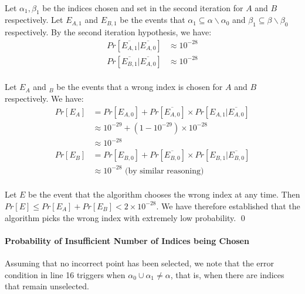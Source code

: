 \paragraph{}
Let $\alpha_1, \beta_1$ be the indices chosen and set in the second iteration for $A$ and $B$ respectively. Let $E_{A,1}$ and $E_{B,1}$ be the events that $\alpha_1 \subseteq \alpha \backslash \alpha_0$ and $\beta_1 \subseteq \beta \backslash \beta_0$ respectively. By the second iteration hypothesis, we have:
\begin{align*}
    Pr[\overline{E_{A,1}} | \overline{E_{A,0}}] &\approx 10^{-28}\\
    Pr[\overline{E_{B,1}} | \overline{E_{A,0}}] &\approx 10^{-28}
\end{align*}

\paragraph{}
Let $E_A$ and $_B$ be the events that a wrong index is chosen for $A$ and $B$ respectively. We have:
\begin{align*}
    Pr[E_A] &= Pr[E_{A,0}] + Pr[\overline{E_{A,0}}] \times Pr[E_{A,1} | \overline{E_{A,0}}]\\
    &\approx 10^{-29} + (1 - 10^{-29}) \times 10^{-28}\\
    &\approx 10^{-28}\\
    Pr[E_B] &= Pr[E_{B,0}] + Pr[\overline{E_{B,0}}] \times Pr[E_{B,1} | \overline{E_{B,0}}]\\
    &\approx 10^{-28} \text{     (by similar reasoning)}
\end{align*}

\paragraph{}
Let $E$ be the event that the algorithm chooses the wrong index at any time. Then $Pr[E] \leq Pr[E_A] + Pr[E_B] < 2 \times 10^{-28}$. We have therefore established that the algorithm picks the wrong index with extremely low probability. \qed

\paragraph{\textbf{Probability of Insufficient Number of Indices being Chosen}}
Assuming that no incorrect point has been selected, we note that the error condition in line 16 triggers when $\alpha_0 \cup \alpha_1 \not= \alpha$, that is, when there are indices that remain unselected.

